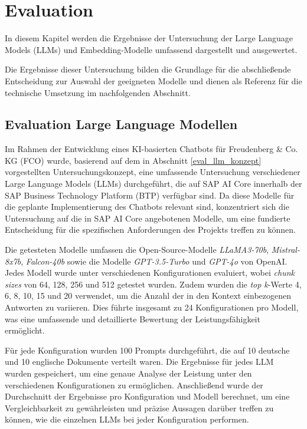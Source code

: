 \chapter{Evaluation}
\label{evaluation}
\nocite{*}

In diesem Kapitel werden die Ergebnisse der Untersuchung der Large Language Models (\acp{LLM}) und Embedding-Modelle umfassend dargestellt und ausgewertet. 

Die Ergebnisse dieser Untersuchung bilden die Grundlage für die abschließende Entscheidung zur Auswahl der geeigneten Modelle und dienen als Referenz für die technische Umsetzung im nachfolgenden Abschnitt.

\section{Evaluation Large Language Modellen}
\label{eval_llm}

Im Rahmen der Entwicklung eines \ac{KI}-basierten Chatbots für Freudenberg \& Co. KG (\ac{FCO}) wurde, basierend auf dem in Abschnitt \ref{eval_llm_konzept} vorgestellten Untersuchungskonzept, 
eine umfassende Untersuchung verschiedener Large Language Models (\acp{LLM}) durchgeführt, die auf SAP AI Core innerhalb der SAP Business Technology Platform (\ac{BTP}) verfügbar sind. 
Da diese Modelle für die geplante Implementierung des Chatbots relevant sind, konzentriert sich die Untersuchung auf die in SAP AI Core angebotenen Modelle, 
um eine fundierte Entscheidung für die spezifischen Anforderungen des Projekts treffen zu können.

Die getesteten Modelle umfassen die Open-Source-Modelle \textit{LLaMA3-70b}, \textit{Mistral-8x7b}, \textit{Falcon-40b} sowie die Modelle \textit{GPT-3.5-Turbo} und \textit{GPT-4o} von OpenAI. 
Jedes Modell wurde unter verschiedenen Konfigurationen evaluiert, wobei \textit{chunk sizes} von 64, 128, 256 und 512 getestet wurden. Zudem wurden die \textit{top k}-Werte 4, 6, 8, 10, 15 und 20 verwendet, 
um die Anzahl der in den Kontext einbezogenen Antworten zu variieren. Dies führte insgesamt zu 24 Konfigurationen pro Modell, was eine umfassende und detaillierte Bewertung der Leistungsfähigkeit ermöglicht.

Für jede Konfiguration wurden 100 Prompts durchgeführt, die auf 10 deutsche und 10 englische Dokumente verteilt waren. Die Ergebnisse für jedes \ac{LLM} wurden gespeichert, 
um eine genaue Analyse der Leistung unter den verschiedenen Konfigurationen zu ermöglichen. Anschließend wurde der Durchschnitt der Ergebnisse pro Konfiguration und Modell berechnet, 
um eine Vergleichbarkeit zu gewährleisten und präzise Aussagen darüber treffen zu können, wie die einzelnen \acp{LLM} bei jeder Konfiguration performen.

